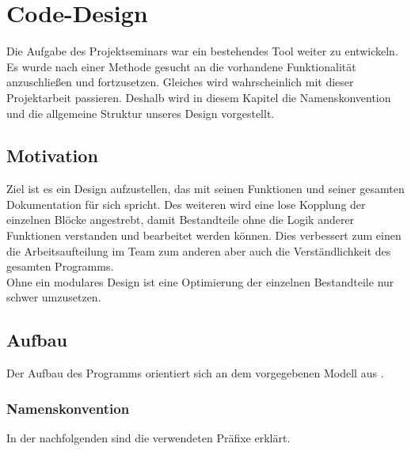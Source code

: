 \documentclass[../Report.tex]{subfiles}
\begin{document}
\chapter{Code-Design}
\label{chap:code}
Die Aufgabe des Projektseminars war ein bestehendes Tool weiter zu entwickeln. Es wurde nach einer Methode gesucht an die vorhandene Funktionalität anzuschließen und fortzusetzen. Gleiches wird wahrscheinlich mit dieser Projektarbeit passieren. Deshalb wird in diesem Kapitel die Namenskonvention und die allgemeine Struktur unseres Design vorgestellt.

\section{Motivation}
\label{sec:code.motivation}
Ziel ist es ein Design aufzustellen, das mit seinen Funktionen und seiner gesamten Dokumentation für sich spricht. Des weiteren wird eine lose Kopplung der einzelnen Blöcke angestrebt, damit Bestandteile ohne die Logik anderer Funktionen verstanden und bearbeitet werden können. Dies verbessert zum einen die Arbeitsaufteilung im Team zum anderen aber auch die Verständlichkeit des gesamten Programms. \\
Ohne ein modulares Design ist eine Optimierung der einzelnen Bestandteile nur schwer umzusetzen.

\section{Aufbau}
\label{sec:code.aufbau}
Der Aufbau des Programms orientiert sich an dem vorgegebenen Modell aus .

\subsection*{Namenskonvention}
\label{subsec:code.namen}
In der nachfolgenden  sind die verwendeten Präfixe erklärt.
	
\end{document}
